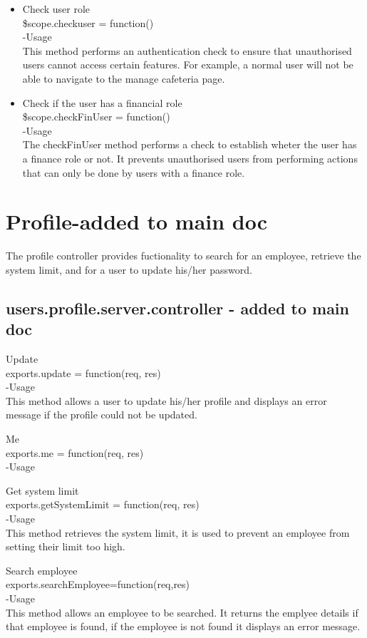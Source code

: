 \documentclass[a4paper,12pt]{article}
\begin{document}
\begin{itemize}
\item Check user role\\
 \$scope.checkuser = function()\\
-Usage\\
This method performs an authentication check to ensure that unauthorised users cannot access certain features. For example, a normal user will not be able to navigate to the manage cafeteria page.

\item Check if the user has a financial role\\
 \$scope.checkFinUser = function()\\
-Usage\\
The checkFinUser method performs a check to establish wheter the user has a finance role or not. It prevents unauthorised users from performing actions that can only be done by users with a finance role.
 \end{itemize}
 \section{Profile-added to main doc}
 The profile controller provides fuctionality to search for an employee, retrieve the system limit, and for a user to update his/her password.
 \subsection{users.profile.server.controller - added to main doc} 
 \item Update\\
 exports.update = function(req, res)\\
 -Usage\\
 This method allows a user to update his/her profile and displays an error message if the profile could not be updated.
 \item Me\\
 exports.me = function(req, res)\\
 -Usage\\
 
 \item Get system limit\\
 exports.getSystemLimit = function(req, res)\\
 -Usage\\
 This method retrieves the system limit, it is used to prevent an employee from setting their limit too high.
 \item Search employee\\
 exports.searchEmployee=function(req,res)\\
 -Usage\\
 This method allows an employee to be searched. It returns the emplyee details if that employee is found, if the employee is not found it displays an error message.
 \begin{itemize}
 
 \end{itemize}
\end{document}
